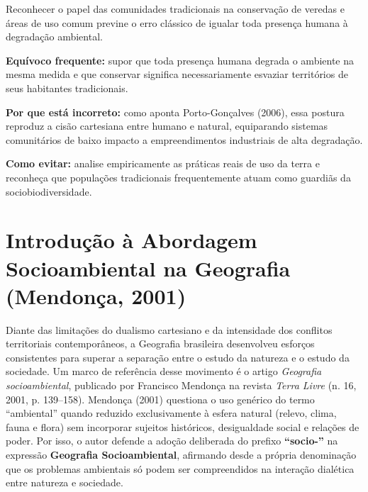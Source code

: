 Reconhecer o papel das comunidades tradicionais na conservação de veredas e áreas de uso comum previne o erro clássico de igualar toda presença humana à degradação ambiental.

\begin{boxErro}
\textbf{Equívoco frequente:} supor que toda presença humana degrada o ambiente na mesma medida e que conservar significa necessariamente esvaziar territórios de seus habitantes tradicionais.

\textbf{Por que está incorreto:} como aponta Porto-Gonçalves (2006), essa postura reproduz a cisão cartesiana entre humano e natural, equiparando sistemas comunitários de baixo impacto a empreendimentos industriais de alta degradação.

\textbf{Como evitar:} analise empiricamente as práticas reais de uso da terra e reconheça que populações tradicionais frequentemente atuam como guardiãs da sociobiodiversidade.
\end{boxErro}

\section{Introdução à Abordagem Socioambiental na Geografia (Mendonça, 2001)}

Diante das limitações do dualismo cartesiano e da intensidade dos conflitos territoriais contemporâneos, a Geografia brasileira desenvolveu esforços consistentes para superar a separação entre o estudo da natureza e o estudo da sociedade. Um marco de referência desse movimento é o artigo \emph{Geografia socioambiental}, publicado por Francisco Mendonça na revista \emph{Terra Livre} (n. 16, 2001, p. 139--158). Mendonça (2001) questiona o uso genérico do termo ``ambiental'' quando reduzido exclusivamente à esfera natural (relevo, clima, fauna e flora) sem incorporar sujeitos históricos, desigualdade social e relações de poder. Por isso, o autor defende a adoção deliberada do prefixo \textbf{``socio-''} na expressão \textbf{Geografia Socioambiental}, afirmando desde a própria denominação que os problemas ambientais só podem ser compreendidos na interação dialética entre natureza e sociedade.

